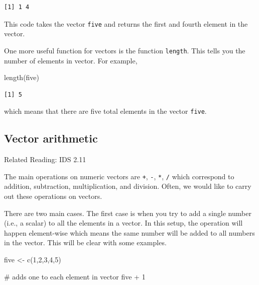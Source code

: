 \documentclass[
  letterpaper,
  DIV=11,
  numbers=noendperiod]{scrreprt}
\newenvironment{Shaded}{\begin{snugshade}}{\end{snugshade}}
\newcommand{\CommentTok}[1]{\textcolor[rgb]{0.37,0.37,0.37}{#1}}
\newcommand{\DecValTok}[1]{\textcolor[rgb]{0.68,0.00,0.00}{#1}}
\newcommand{\FunctionTok}[1]{\textcolor[rgb]{0.28,0.35,0.67}{#1}}
\newcommand{\NormalTok}[1]{\textcolor[rgb]{0.00,0.23,0.31}{#1}}
\newcommand{\OtherTok}[1]{\textcolor[rgb]{0.00,0.23,0.31}{#1}}
\newcommand{\SpecialCharTok}[1]{\textcolor[rgb]{0.37,0.37,0.37}{#1}}
\begin{document}
\begin{verbatim}
[1] 1 4
\end{verbatim}

This code takes the vector \texttt{five} and returns the first and
fourth element in the vector.

One more useful function for vectors is the function \texttt{length}.
This tells you the number of elements in vector. For example,

\begin{Shaded}
\begin{Highlighting}[]
\FunctionTok{length}\NormalTok{(five)}
\end{Highlighting}
\end{Shaded}

\begin{verbatim}
[1] 5
\end{verbatim}

which means that there are five total elements in the vector
\texttt{five}.

\subsection{Vector arithmetic}\label{vector-arithmetic}

Related Reading: IDS 2.11

The main operations on numeric vectors are \texttt{+}, \texttt{-},
\texttt{*}, \texttt{/} which correspond to addition, subtraction,
multiplication, and division. Often, we would like to carry out these
operations on vectors.

There are two main cases. The first case is when you try to add a single
number (i.e., a scalar) to all the elements in a vector. In this setup,
the operation will happen element-wise which means the same number will
be added to all numbers in the vector. This will be clear with some
examples.

\begin{Shaded}
\begin{Highlighting}[]
\NormalTok{five }\OtherTok{\textless{}{-}} \FunctionTok{c}\NormalTok{(}\DecValTok{1}\NormalTok{,}\DecValTok{2}\NormalTok{,}\DecValTok{3}\NormalTok{,}\DecValTok{4}\NormalTok{,}\DecValTok{5}\NormalTok{)}

\CommentTok{\# adds one to each element in vector}
\NormalTok{five }\SpecialCharTok{+} \DecValTok{1}
\end{Highlighting}
\end{Shaded}
\end{document}
